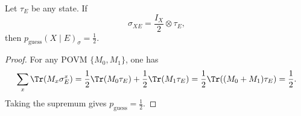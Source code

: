 \begin{lemma}
\label{lem:pguess-uniform}
\notready
Let $\tau_E$ be any state. If
\[
\sigma_{XE}=\frac{I_X}{2}\otimes \tau_E,
\]
then $p_{\mathrm{guess}}(X\mid E)_\sigma=\tfrac12$.
\end{lemma}

\begin{proof}
For any POVM $\{M_0,M_1\}$, one has
\[
\sum_x \Tr(M_x\sigma_E^x)=\frac12\Tr(M_0\tau_E)+\frac12\Tr(M_1\tau_E)=\frac12\Tr((M_0+M_1)\tau_E)=\frac12.
\]
Taking the supremum gives $p_{\mathrm{guess}}=\tfrac12$.
\end{proof}
